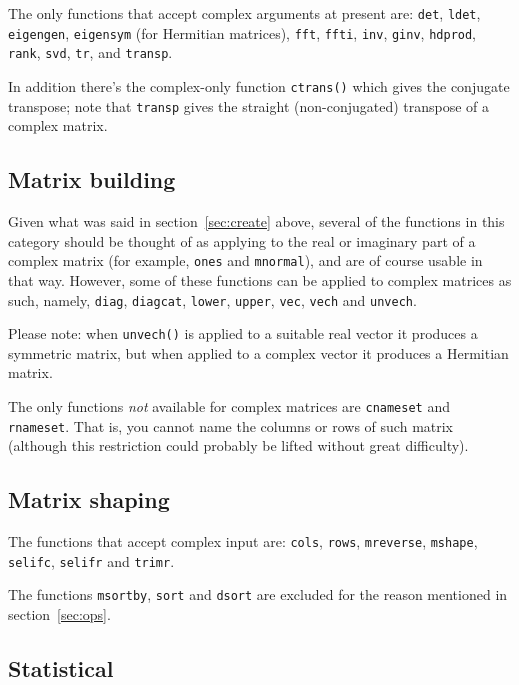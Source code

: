 \documentclass{article}
\begin{document}
The only functions that accept complex arguments at present are:
\texttt{det}, \texttt{ldet}, \texttt{eigengen}, \texttt{eigensym} (for
Hermitian matrices), \texttt{fft}, \texttt{ffti}, \texttt{inv},
\texttt{ginv}, \texttt{hdprod}, \texttt{rank}, \texttt{svd},
\texttt{tr}, and \texttt{transp}.

In addition there's the complex-only function \texttt{ctrans()} which
gives the conjugate transpose; note that \texttt{transp} gives the
straight (non-conjugated) transpose of a complex matrix.

\subsection{Matrix building}

Given what was said in section~\ref{sec:create} above, several of the
functions in this category should be thought of as applying to the
real or imaginary part of a complex matrix (for example, \texttt{ones}
and \texttt{mnormal}), and are of course usable in that way.  However,
some of these functions can be applied to complex matrices as such,
namely, \texttt{diag}, \texttt{diagcat}, \texttt{lower},
\texttt{upper}, \texttt{vec}, \texttt{vech} and \texttt{unvech}.

Please note: when \texttt{unvech()} is applied to a suitable real
vector it produces a symmetric matrix, but when applied to a complex
vector it produces a Hermitian matrix.

The only functions \textit{not} available for complex matrices are
\texttt{cnameset} and \texttt{rnameset}. That is, you cannot name the
columns or rows of such matrix (although this restriction could
probably be lifted without great difficulty).

\subsection{Matrix shaping}

The functions that accept complex input are: \texttt{cols},
\texttt{rows}, \texttt{mreverse}, \texttt{mshape}, \texttt{selifc},
\texttt{selifr} and \texttt{trimr}.

The functions \texttt{msortby}, \texttt{sort} and \texttt{dsort} are
excluded for the reason mentioned in section~\ref{sec:ops}.

\subsection{Statistical}
\end{document}
